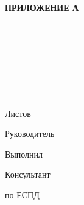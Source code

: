 \begin{ESKDtitlePage}
    \begin{flushright}
        \textbf{ПРИЛОЖЕНИЕ А} \enspace\enspace
    \end{flushright}
    \begin{center}
        \gpiEdu \\
        \gpiKaf \\
    \end{center}

    \vfill

    \begin{center}
        \gpiTopic \\
    \end{center}

    \vfill

    \begin{center}
        \textbf{\gpiDocTopic} \\
    \end{center}

    \vfill

    \begin{center}
        \gpiCode \\
        Листов \pageref{LastPage} \\
    \end{center}

    \vfill

    \begin{flushright}
        \begin{minipage}[t]{.49\textwidth}
            \begin{minipage}[t]{.75\textwidth}
                \begin{flushright}
                    Руководитель

                    Выполнил

                    Консультант

                    по ЕСПД
                \end{flushright}
            \end{minipage}
        \end{minipage}
        \begin{minipage}[t]{.49\textwidth}
            \begin{flushright}
                \begin{minipage}[t]{.75\textwidth}
                    \gpiTeacherName~\gpiTeacherSurname


\end{minipage}
\end{flushright}
\end{minipage}
\end{flushright}
\end{ESKDtitlePage}
